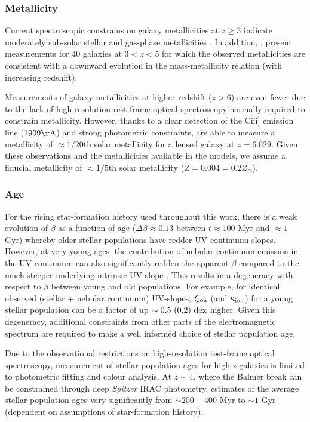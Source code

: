 \subsubsection{Metallicity}\label{reion-sec:metallicity}
Current spectroscopic constrains on galaxy metallicities at $z \geq 3$ indicate moderately sub-solar stellar and gas-phase metallicities \citep{Shapley:2003wi,Maiolino:2008gs,Laskar:2011cc,Jones:2012kn,2012A&A...539A.136S}. In addition, \citet{Troncoso:2014kg}, present measurements for 40 galaxies at $3 < z < 5$ for which the observed metallicities are consistent with a downward evolution in the mass-metallicity relation (with increasing redshift).
    
Measurements of galaxy metallicities at higher redshift ($z>6$) are even fewer due to the lack of high-resolution rest-frame optical spectroscopy normally required to constrain metallicity. However, thanks to a clear detection of the {\sc Ciii]} emission line ($1909\rm{\AA}$) and strong photometric constraints, \citet{2015MNRAS.450.1846S} are able to measure a metallicity of $\approx 1/20$th solar metallicity for a lensed galaxy at $z = 6.029$. Given these observations and the metallicities available in the \citet{Bruzual:2003ckb} models, we assume a fiducial metallicity of $\approx 1/5$th solar metallicity ($Z = 0.004 = 0.2 Z_{\odot}$).

\subsubsection{Age}
For the rising star-formation history used throughout this work, there is a weak evolution of $\beta$ as a function of age ($\Delta\beta \approx 0.13$ between $t \approx 100$ Myr and $\approx 1$ Gyr) whereby older stellar populations have redder UV continuum slopes. However, at very young ages, the contribution of nebular continuum emission in the UV continuum can also significantly redden the apparent $\beta$ compared to the much steeper underlying intrinsic UV slope \citep{2010Natur.468...49R}.  This results in a degeneracy with respect to $\beta$ between young and old populations. For example, for identical observed (stellar + nebular continuum) UV-slopes, $\xi_{\rm{ion}}$ (and $\kappa_{\rm{ion}}$) for a young stellar population can be a factor of up $\sim 0.5~ (0.2)~\rm{dex}$ higher. Given this degeneracy, additional constraints from other parts of the electromagnetic spectrum are required to make a well informed choice of stellar population age.

Due to the observational restrictions on high-resolution rest-frame optical spectroscopy, measurement of stellar population ages for high-z galaxies is limited to photometric fitting and colour analysis. At $z\sim4$, where the Balmer break can be constrained through deep \emph{Spitzer} IRAC photometry, estimates of the average stellar population ages vary significantly from $\sim 200-400$ Myr \citep{Lee:2011dw} to $\sim1$ Gyr \citep{Oesch:2013eb} (dependent on assumptions of star-formation history). 
 
